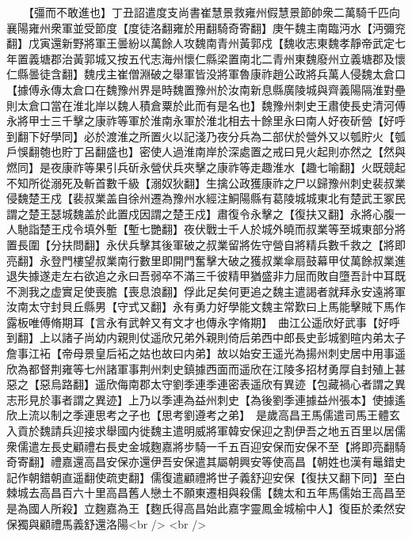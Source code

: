 　　【彊而不敢進也】丁丑詔遣度支尚書崔慧景救雍州假慧景節帥衆二萬騎千匹向襄陽雍州衆軍並受節度【度徒洛翻雍於用翻騎奇寄翻】庚午魏主南臨沔水【沔彌兖翻】戊寅還新野將軍王曇紛以萬餘人攻魏南青州黃郭戍【魏收志東魏孝靜帝武定七年置義塘郡治黃郭城又按五代志海州懷仁縣梁置南北二青州東魏廢州立義塘郡及懷仁縣曇徒含翻】魏戌主崔僧淵破之舉軍皆没將軍魯康祚趙公政將兵萬人侵魏太倉口【據傅永傳太倉口在魏豫州界是時魏置豫州於汝南新息縣廣陵城與齊義陽隔淮對壘則太倉口當在淮北岸以魏人積倉粟於此而有是名也】魏豫州刺史王肅使長史清河傅永將甲士三千擊之康祚等軍於淮南永軍於淮北相去十餘里永曰南人好夜斫營【好呼到翻下好學同】必於渡淮之所置火以記淺乃夜分兵為二部伏於營外又以瓠貯火【瓠戶悞翻匏也貯丁呂翻盛也】密使人過淮南岸於深處置之戒曰見火起則亦然之【然與燃同】是夜康祚等果引兵斫永營伏兵夾擊之康祚等走趣淮水【趣七喻翻】火既競起不知所從溺死及斬首數千級【溺奴狄翻】生擒公政獲康祚之尸以歸豫州刺史裴叔業侵魏楚王戍【裴叔業盖自徐州遷為豫州水經注鮦陽縣有葛陵城城東北有楚武王冢民謂之楚王瑟城魏盖於此置戍因謂之楚王戍】肅復令永擊之【復扶又翻】永將心腹一人馳詣楚王戍令填外塹【塹七艷翻】夜伏戰士千人於城外曉而叔業等至城東部分將置長圍【分扶問翻】永伏兵擊其後軍破之叔業留將佐守營自將精兵數千救之【將即亮翻】永登門樓望叔業南行數里即開門奮擊大破之獲叔業傘扇鼓幕甲仗萬餘叔業進退失據遂走左右欲追之永曰吾弱卒不滿三千彼精甲猶盛非力屈而敗自墮吾計中耳既不測我之虚實足使喪膽【喪息浪翻】俘此足矣何更追之魏主遣謁者就拜永安遠將軍汝南太守封貝丘縣男【守式又翻】永有勇力好學能文魏主常歎曰上馬能擊賊下馬作露板唯傅脩期耳【言永有武幹又有文才也傳永字脩期】　曲江公遥欣好武事【好呼到翻】上以諸子尚幼内親則仗遥欣兄弟外親則倚后弟西中郎長史彭城劉暄内弟太子詹事江袥【帝母景皇后袥之姑也故曰内弟】故以始安王遥光為揚州刺史居中用事遥欣為都督荆雍等七州諸軍事荆州刺史鎮據西面而遥欣在江陵多招材勇厚自封殖上甚惡之【惡烏路翻】遥欣侮南郡太守劉季連季連密表遥欣有異迹【包藏禍心者謂之異志形見於事者謂之異迹】上乃以季連為益州刺史【為後劉季連據益州張本】使據遙欣上流以制之季連思考之子也【思考劉遵考之弟】　是歲高昌王馬儒遣司馬王體玄入貢於魏請兵迎接求舉國内徙魏主遣明威將軍韓安保迎之割伊吾之地五百里以居儒衆儒遣左長史顧禮右長史金城麴嘉將步騎一千五百迎安保而安保不至【將即亮翻騎奇寄翻】禮嘉還高昌安保亦還伊吾安保遣其屬朝興安等使高昌【朝姓也漢有鼂錯史記作朝錯朝直遥翻使疏吏翻】儒復遣顧禮將世子義舒迎安保【復扶又翻下同】至白棘城去高昌百六十里高昌舊人戀土不願東遷相與殺儒【魏太和五年馬儒始王高昌至是為國人所殺】立麴嘉為王【麴氏得高昌始此嘉字靈鳳金城榆中人】復臣於柔然安保獨與顧禮馬義舒還洛陽<br />
<br />
